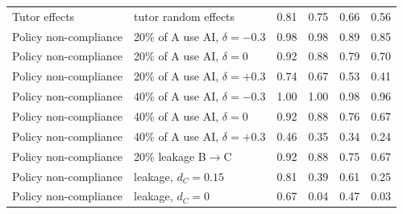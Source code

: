 \begin{table}[t]
\begin{tabular}{llcccc}
Tutor effects & tutor random effects & 0.81 & 0.75 & 0.66 & 0.56\\
Policy non-compliance & 20\% of A use AI, $\delta=-0.3$ & 0.98 & 0.98 & 0.89 & 0.85\\
Policy non-compliance & 20\% of A use AI, $\delta=0$ & 0.92 & 0.88 & 0.79 & 0.70\\
Policy non-compliance & 20\% of A use AI, $\delta=+0.3$ & 0.74 & 0.67 & 0.53 & 0.41\\
Policy non-compliance & 40\% of A use AI, $\delta=-0.3$ & 1.00 & 1.00 & 0.98 & 0.96\\
Policy non-compliance & 40\% of A use AI, $\delta=0$ & 0.92 & 0.88 & 0.76 & 0.67\\
Policy non-compliance & 40\% of A use AI, $\delta=+0.3$ & 0.46 & 0.35 & 0.34 & 0.24\\
Policy non-compliance & 20\% leakage B$\to$C & 0.92 & 0.88 & 0.75 & 0.67\\
Policy non-compliance & leakage, $d_C=0.15$ & 0.81 & 0.39 & 0.61 & 0.25\\
Policy non-compliance & leakage, $d_C=0$ & 0.67 & 0.04 & 0.47 & 0.03\\
\bottomrule
\end{tabular}
\end{table}
